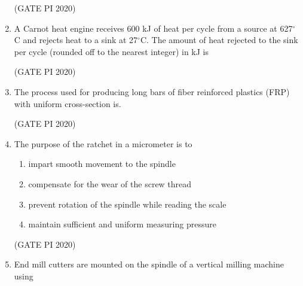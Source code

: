 \documentclass[journal,12pt,onecolumn]{IEEEtran}
\theoremstyle{remark}
\begin{document}
\begin{enumerate}
\hfill (GATE PI 2020)

\item A Carnot heat engine receives 600 kJ of heat per cycle from a source at 627$^\circ$C and rejects heat to a sink at 27$^\circ$C. The amount of heat rejected to the sink per cycle (rounded off to the nearest integer) in kJ is 

\begin{enumerate}
\end{enumerate}

\hfill (GATE PI 2020)

\item The process used for producing long bars of fiber reinforced plastics (FRP) with uniform cross-section is.

\begin{enumerate}
\end{enumerate}

\hfill (GATE PI 2020)

\item The purpose of the ratchet in a micrometer is to

\begin{enumerate}
\item impart smooth movement to the spindle
\item compensate for the wear of the screw thread
\item prevent rotation of the spindle while reading the scale
\item maintain sufficient and uniform measuring pressure
\end{enumerate}

\hfill (GATE PI 2020)

\item End mill cutters are mounted on the spindle of a vertical milling machine using
\begin{enumerate}
\end{enumerate}


\end{enumerate}
\end{document}
